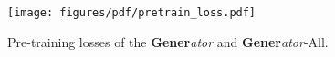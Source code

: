 \begin{figure}[ht]
    \centering
    \texttt{[image: figures/pdf/pretrain\_loss.pdf]}
    \caption{Pre-training losses of the \textbf{Gener}\textit{ator} and \textbf{Gener}\textit{ator}-All.}
    \label{fig:pretrain_loss}
\end{figure}